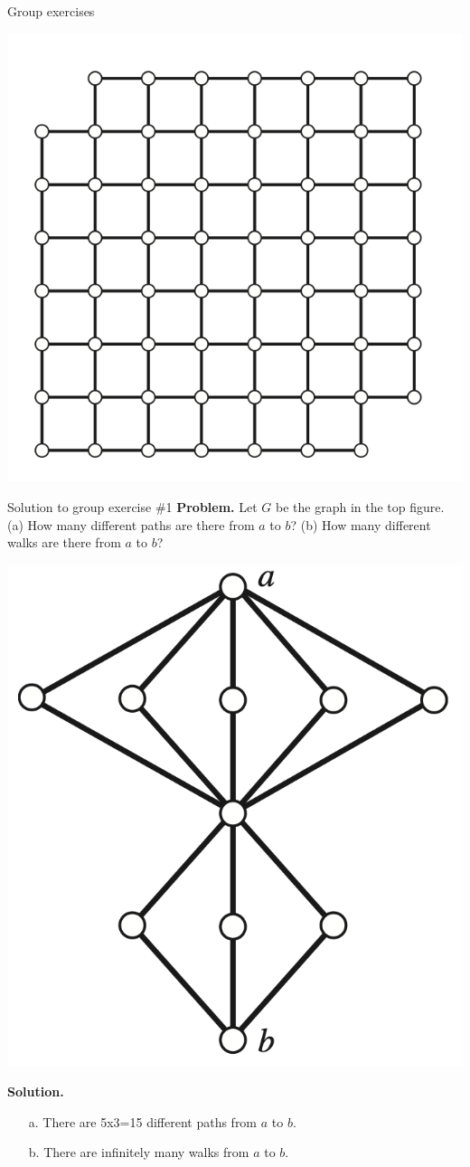 \documentclass[10pt]{beamer}
\begin{document}
\begin{frame}{Group exercises}
\begin{minipage}{0.38\textwidth}
    \includegraphics[width=\textwidth]{images/connection_exercise_2}
  
\end{minipage}%

\end{frame}

\begin{frame}{Solution to group exercise \#1}
\small 
\noindent
\textbf{Problem.} Let $G$ be the graph in the top figure.   (a) How many different paths are there from $a$ to $b$? (b) How many different walks are there from $a$ to $b$?

\begin{center}
    \includegraphics[width=.3\textwidth]{images/connection_exercise_1} %
\end{center}
\vfill 
\textbf{Solution.}
\begin{itemize}
\item[a.] There are 5x3=15 different paths from $a$ to $b$.
\item[b.] There are infinitely many walks from $a$ to $b$.
\end{itemize}

\end{frame}
\end{document}
